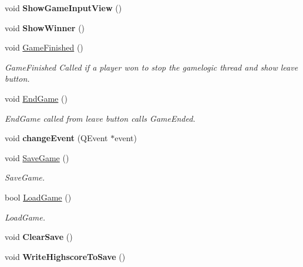 \begin{DoxyCompactItemize}
\item 
\hypertarget{classGameView_a92b306e86ed8fe682763050be4edf254}{void {\bfseries Show\-Game\-Input\-View} ()}\label{classGameView_a92b306e86ed8fe682763050be4edf254}

\item 
\hypertarget{classGameView_a29cba4e6e6963b659f3cb2acbdfc3fe1}{void {\bfseries Show\-Winner} ()}\label{classGameView_a29cba4e6e6963b659f3cb2acbdfc3fe1}

\item 
\hypertarget{classGameView_a3e06ec8f766005c4aac0d572559fc9ed}{void \hyperlink{classGameView_a3e06ec8f766005c4aac0d572559fc9ed}{Game\-Finished} ()}\label{classGameView_a3e06ec8f766005c4aac0d572559fc9ed}

\begin{DoxyCompactList}\small\item\em Game\-Finished Called if a player won to stop the gamelogic thread and show leave button. \end{DoxyCompactList}\item 
\hypertarget{classGameView_a157ac747504394587761ac30a79b9597}{void \hyperlink{classGameView_a157ac747504394587761ac30a79b9597}{End\-Game} ()}\label{classGameView_a157ac747504394587761ac30a79b9597}

\begin{DoxyCompactList}\small\item\em End\-Game called from leave button calls Game\-Ended. \end{DoxyCompactList}\item 
\hypertarget{classGameView_a5d6aac6e502ec51285f03ba51da00886}{void {\bfseries change\-Event} (Q\-Event $\ast$event)}\label{classGameView_a5d6aac6e502ec51285f03ba51da00886}

\item 
\hypertarget{classGameView_a737578d62ebb8c52ba35e75a2ece8a6a}{void \hyperlink{classGameView_a737578d62ebb8c52ba35e75a2ece8a6a}{Save\-Game} ()}\label{classGameView_a737578d62ebb8c52ba35e75a2ece8a6a}

\begin{DoxyCompactList}\small\item\em Save\-Game. \end{DoxyCompactList}\item 
bool \hyperlink{classGameView_a0721ab15501b0d305ebd98bddaa69e78}{Load\-Game} ()
\begin{DoxyCompactList}\small\item\em Load\-Game. \end{DoxyCompactList}\item 
\hypertarget{classGameView_a5dcba132a4be698ebfc562f50f610cbd}{void {\bfseries Clear\-Save} ()}\label{classGameView_a5dcba132a4be698ebfc562f50f610cbd}

\item 
\hypertarget{classGameView_a8e52303b1fc91467ad2ec42f18680eae}{void {\bfseries Write\-Highscore\-To\-Save} ()}\label{classGameView_a8e52303b1fc91467ad2ec42f18680eae}

\end{DoxyCompactItemize}
